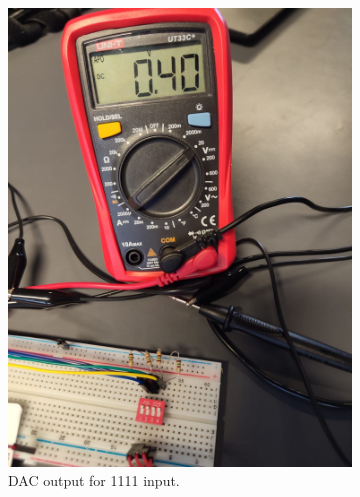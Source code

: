 \begin{figure}[H]
\begin{subfigure}[]{0.2\textwidth}
\includegraphics[width=\linewidth]{./Figures/DAC_Prac_1111.jpeg}
\caption{DAC output for 1111 input.}
\label{subfig:dac_prac_1111}
\end{subfigure}
\hfill
\begin{subfigure}[]{0.2\textwidth}

\end{subfigure}
\end{figure}
